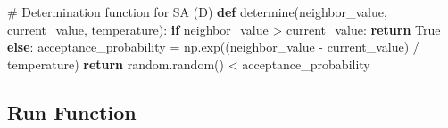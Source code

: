 \documentclass[
  letterpaper,
  DIV=11,
  numbers=noendperiod]{scrreprt}
\newenvironment{Shaded}{\begin{snugshade}}{\end{snugshade}}
\newcommand{\CommentTok}[1]{\textcolor[rgb]{0.37,0.37,0.37}{#1}}
\newcommand{\ControlFlowTok}[1]{\textcolor[rgb]{0.00,0.23,0.31}{\textbf{#1}}}
\newcommand{\KeywordTok}[1]{\textcolor[rgb]{0.00,0.23,0.31}{\textbf{#1}}}
\newcommand{\NormalTok}[1]{\textcolor[rgb]{0.00,0.23,0.31}{#1}}
\newcommand{\OperatorTok}[1]{\textcolor[rgb]{0.37,0.37,0.37}{#1}}
\newcommand{\VariableTok}[1]{\textcolor[rgb]{0.07,0.07,0.07}{#1}}
\begin{document}
\begin{Shaded}
\begin{Highlighting}[]
\CommentTok{\# Determination function for SA (D)}
\KeywordTok{def}\NormalTok{ determine(neighbor\_value, current\_value, temperature):}
    \ControlFlowTok{if}\NormalTok{ neighbor\_value }\OperatorTok{\textgreater{}}\NormalTok{ current\_value:}
        \ControlFlowTok{return} \VariableTok{True}
    \ControlFlowTok{else}\NormalTok{:}
\NormalTok{        acceptance\_probability }\OperatorTok{=}\NormalTok{ np.exp((neighbor\_value }\OperatorTok{{-}}\NormalTok{ current\_value) }\OperatorTok{/}\NormalTok{ temperature)}
        \ControlFlowTok{return}\NormalTok{ random.random() }\OperatorTok{\textless{}}\NormalTok{ acceptance\_probability}
\end{Highlighting}
\end{Shaded}

\subsection{Run Function}\label{run-function}
\end{document}
